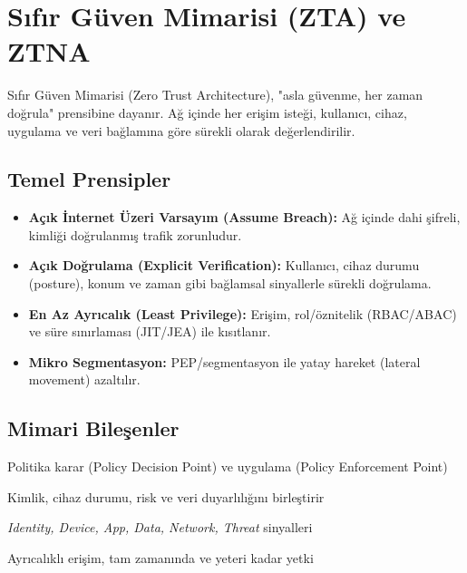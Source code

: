 \section{Sıfır Güven Mimarisi (ZTA) ve ZTNA}

Sıfır Güven Mimarisi (Zero Trust Architecture), "asla güvenme, her zaman doğrula" prensibine dayanır. Ağ içinde her erişim isteği, kullanıcı, cihaz, uygulama ve veri bağlamına göre sürekli olarak değerlendirilir.


\subsection{Temel Prensipler}
\begin{itemize}
  \item \textbf{Açık İnternet Üzeri Varsayım (Assume Breach):} Ağ içinde dahi şifreli, kimliği doğrulanmış trafik zorunludur.
  \item \textbf{Açık Doğrulama (Explicit Verification):} Kullanıcı, cihaz durumu (posture), konum ve zaman gibi bağlamsal sinyallerle sürekli doğrulama.
  \item \textbf{En Az Ayrıcalık (Least Privilege):} Erişim, rol/öznitelik (RBAC/ABAC) ve süre sınırlaması (JIT/JEA) ile kısıtlanır.
  \item \textbf{Mikro Segmentasyon:} PEP/segmentasyon ile yatay hareket (lateral movement) azaltılır.
\end{itemize}

\subsection{Mimari Bileşenler}
\begin{description}[leftmargin=3.8cm,labelwidth=3.4cm,style=multiline]
  \item[PDP/PEP] Politika karar (Policy Decision Point) ve uygulama (Policy Enforcement Point)
  \item[Policy Engine] Kimlik, cihaz durumu, risk ve veri duyarlılığını birleştirir
  \item[Signals] \textit{Identity, Device, App, Data, Network, Threat} sinyalleri
  \item[PAM/JIT/JEA] Ayrıcalıklı erişim, tam zamanında ve yeteri kadar yetki
\end{description}

